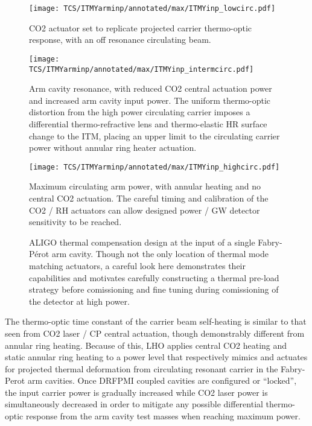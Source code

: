 \begin{figure}[H]
	\begin{subcaptiongroup}
		\centering
		\texttt{[image: TCS/ITMYarminp/annotated/max/ITMYinp\_lowcirc.pdf]}
		\caption{CO2 actuator set to replicate projected carrier thermo-optic response, with an off resonance circulating beam.}\label{subfig:TCSinp_lowcirc}
		\texttt{[image: TCS/ITMYarminp/annotated/max/ITMYinp\_intermcirc.pdf]}
		\caption{Arm cavity resonance, with reduced CO2 central actuation power and increased arm cavity input power. The uniform thermo-optic distortion from the high power circulating carrier imposes a differential thermo-refractive lens and thermo-elastic HR surface change to the ITM, placing an upper limit to the circulating carrier power without annular ring heater actuation.}\label{subfig:TCSinp_intcirc}
		\texttt{[image: TCS/ITMYarminp/annotated/max/ITMYinp\_highcirc.pdf]}
		\caption{Maximum circulating arm power, with annular heating and no central CO2 actuation. The careful timing and calibration of the CO2 / RH actuators can allow designed power / GW detector sensitivity to be reached.}\label{subfig:TCSinp_highcirc}
	\end{subcaptiongroup}
	\caption{ALIGO thermal compensation design at the input of a single Fabry-P\'{e}rot arm cavity. Though not the only location of thermal mode matching actuators, a careful look here demonstrates their capabilities and motivates carefully constructing a thermal pre-load strategy before comissioning and fine tuning during comissioning of the detector at high power.}
	\label{fig:TCSinp}
\end{figure}

The thermo-optic time constant of the carrier beam self-heating is similar to that seen from CO2 laser / CP central actuation, though demonstrably different from annular ring heating. Because of this, LHO applies central CO2 heating and static annular ring heating to a power level that respectively mimics and actuates for projected thermal deformation from circulating resonant carrier in the Fabry-Perot arm cavities. Once DRFPMI coupled cavities are configured or ``locked'', the input carrier power is gradually increased while CO2 laser power is simultaneously decreased in order to mitigate any possible differential thermo-optic response from the arm cavity test masses when reaching maximum power.

